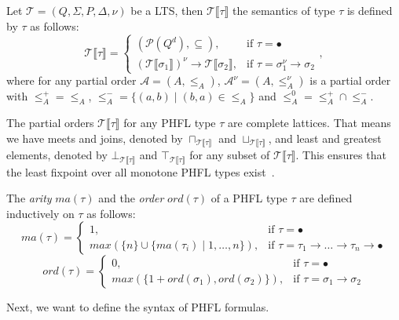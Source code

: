 \begin{definition}
    Let $\mathcal{T} = (Q, \Sigma, P, \Delta, \nu)$ be a LTS, then $\mathcal{T}\llbracket\tau\rrbracket$ the semantics
    of type $\tau$ is defined by $\tau$ as follows:
        \[\mathcal{T}\llbracket\tau\rrbracket=
        \begin{cases}
            (\mathcal{P}(Q^d), \subseteq),  & \text{if }\tau = \bullet\\
            (\mathcal{T}\llbracket\sigma_1\rrbracket)^\nu \rightarrow \mathcal{T}\llbracket\sigma_2\rrbracket, &
            \text{if }\tau = \sigma_1^\nu\rightarrow \sigma_2
        \end{cases},\]
    where for any partial order $\mathcal{A} = (A, \leq_A)$, $\mathcal{A}^\nu = (A, \leq_A^\nu)$ is a partial order
    with $\leq_A^+ = \leq_A$, $\leq_A^- = \{(a, b) \mid (b, a) \in \leq_A\}$ and $\leq_A^0 = \leq_A^+ \cap \leq_A^-$.
\end{definition}

The partial orders $\mathcal{T}\llbracket\tau\rrbracket$ for any PHFL type $\tau$ are complete lattices. That means we
have meets and joins, denoted by $\sqcap_{\mathcal{T}\llbracket\tau\rrbracket}$ and
$\sqcup_{\mathcal{T}\llbracket\tau\rrbracket}$, and least and greatest elements, denoted by
$\bot_{\mathcal{T}\llbracket\tau\rrbracket}$ and $\top_{\mathcal{T}\llbracket\tau\rrbracket}$ for any subset of
$\mathcal{T}\llbracket\tau\rrbracket$. This ensures that the least fixpoint over all monotone PHFL types
exist~\cite{tarski1955lattice}.

\begin{definition}
    The \emph{arity} $ma(\tau)$ and the \emph{order} $ord(\tau)$ of a PHFL type $\tau$ are defined inductively on
    $\tau$ as follows:
\[ma(\tau)=
\begin{cases}
    1, & \text{if }\tau = \bullet\\
    max(\{n\} \cup \{ma(\tau_i)\mid1,\dots,n\}), &
    \text{if }\tau = \tau_1\rightarrow\dots\rightarrow\tau_n\rightarrow\bullet
\end{cases}\]
\[ord(\tau)=
\begin{cases}
    0, & \text{if }\tau = \bullet\\
    max(\{1 + ord(\sigma_1), ord(\sigma_2)\}), & \text{if }\tau = \sigma_1 \rightarrow \sigma_2
\end{cases}\]
\end{definition}

Next, we want to define the syntax of PHFL formulas.


